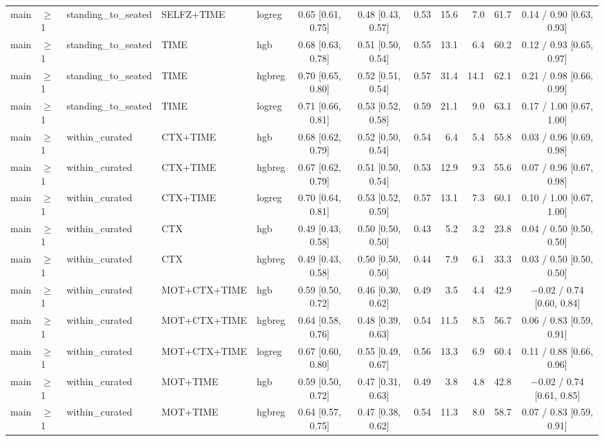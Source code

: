 \begin{longtable}{@{}lllllcccrrrc@{}}
main & $\geq$1 & standing\_to\_seated & SELFZ+TIME & logreg & 0.65 [0.61, 0.75] & 0.48 [0.43, 0.57] & 0.53 & 15.6 & 7.0 & 61.7 & 0.14 / 0.90 [0.63, 0.93] \\
main & $\geq$1 & standing\_to\_seated & TIME & hgb & 0.68 [0.63, 0.78] & 0.51 [0.50, 0.54] & 0.55 & 13.1 & 6.4 & 60.2 & 0.12 / 0.93 [0.65, 0.97] \\
main & $\geq$1 & standing\_to\_seated & TIME & hgbreg & 0.70 [0.65, 0.80] & 0.52 [0.51, 0.54] & 0.57 & 31.4 & 14.1 & 62.1 & 0.21 / 0.98 [0.66, 0.99] \\
main & $\geq$1 & standing\_to\_seated & TIME & logreg & 0.71 [0.66, 0.81] & 0.53 [0.52, 0.58] & 0.59 & 21.1 & 9.0 & 63.1 & 0.17 / 1.00 [0.67, 1.00] \\
main & $\geq$1 & within\_curated & CTX+TIME & hgb & 0.68 [0.62, 0.79] & 0.52 [0.50, 0.54] & 0.54 & 6.4 & 5.4 & 55.8 & 0.03 / 0.96 [0.69, 0.98] \\
main & $\geq$1 & within\_curated & CTX+TIME & hgbreg & 0.67 [0.62, 0.79] & 0.51 [0.50, 0.54] & 0.53 & 12.9 & 9.3 & 55.6 & 0.07 / 0.96 [0.67, 0.98] \\
main & $\geq$1 & within\_curated & CTX+TIME & logreg & 0.70 [0.64, 0.81] & 0.53 [0.52, 0.59] & 0.57 & 13.1 & 7.3 & 60.1 & 0.10 / 1.00 [0.67, 1.00] \\
main & $\geq$1 & within\_curated & CTX & hgb & 0.49 [0.43, 0.58] & 0.50 [0.50, 0.50] & 0.43 & 5.2 & 3.2 & 23.8 & 0.04 / 0.50 [0.50, 0.50] \\
main & $\geq$1 & within\_curated & CTX & hgbreg & 0.49 [0.43, 0.58] & 0.50 [0.50, 0.50] & 0.44 & 7.9 & 6.1 & 33.3 & 0.03 / 0.50 [0.50, 0.50] \\
main & $\geq$1 & within\_curated & MOT+CTX+TIME & hgb & 0.59 [0.50, 0.72] & 0.46 [0.30, 0.62] & 0.49 & 3.5 & 4.4 & 42.9 & $-$0.02 / 0.74 [0.60, 0.84] \\
main & $\geq$1 & within\_curated & MOT+CTX+TIME & hgbreg & 0.64 [0.58, 0.76] & 0.48 [0.39, 0.63] & 0.54 & 11.5 & 8.5 & 56.7 & 0.06 / 0.83 [0.59, 0.91] \\
main & $\geq$1 & within\_curated & MOT+CTX+TIME & logreg & 0.67 [0.60, 0.80] & 0.55 [0.49, 0.67] & 0.56 & 13.3 & 6.9 & 60.4 & 0.11 / 0.88 [0.66, 0.96] \\
main & $\geq$1 & within\_curated & MOT+TIME & hgb & 0.59 [0.50, 0.72] & 0.47 [0.31, 0.63] & 0.49 & 3.8 & 4.8 & 42.8 & $-$0.02 / 0.74 [0.61, 0.85] \\
main & $\geq$1 & within\_curated & MOT+TIME & hgbreg & 0.64 [0.57, 0.75] & 0.47 [0.38, 0.62] & 0.54 & 11.3 & 8.0 & 58.7 & 0.07 / 0.83 [0.59, 0.91] \\

\end{longtable}
